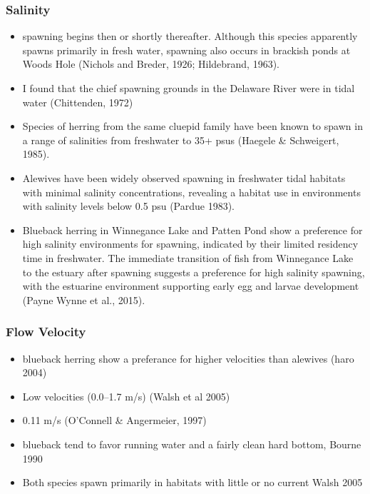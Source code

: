 \documentclass[
]{book}
\providecommand{\tightlist}{%
  \setlength{\itemsep}{0pt}\setlength{\parskip}{0pt}}
\begin{document}
\hypertarget{salinity-6}{%
\subsubsection{Salinity}\label{salinity-6}}

\begin{itemize}
\item
  spawning begins then or shortly thereafter. Although this species apparently spawns primarily in fresh water, spawning also occurs in brackish ponds at Woods Hole (Nichols and Breder, 1926; Hildebrand, 1963).
\item
  I found that the chief spawning grounds in the Delaware River were in tidal water (Chittenden, 1972)
\item
  Species of herring from the same cluepid family have been known to spawn in a range of salinities from freshwater to 35+ psus (Haegele \& Schweigert, 1985).
\item
  Alewives have been widely observed spawning in freshwater tidal habitats with minimal salinity concentrations, revealing a habitat use in environments with salinity levels below 0.5 psu (Pardue 1983).
\item
  Blueback herring in Winnegance Lake and Patten Pond show a preference for high salinity environments for spawning, indicated by their limited residency time in freshwater. The immediate transition of fish from Winnegance Lake to the estuary after spawning suggests a preference for high salinity spawning, with the estuarine environment supporting early egg and larvae development (Payne Wynne et al., 2015).
\end{itemize}

\hypertarget{flow-velocity-6}{%
\subsubsection{Flow Velocity}\label{flow-velocity-6}}

\begin{itemize}
\tightlist
\item
  blueback herring show a preferance for higher velocities than alewives (haro 2004)
\item
  Low velocities (0.0--1.7 m/s) (Walsh et al 2005)
\item
  0.11 m/s (O'Connell \& Angermeier, 1997)
\item
  blueback tend to favor running water and a fairly clean hard bottom, Bourne 1990
\item
  Both species spawn primarily in habitats with little or no current Walsh 2005
\end{itemize}
\end{document}
